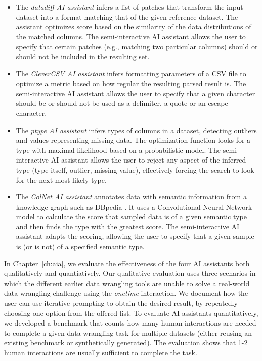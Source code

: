 \documentclass[fleqn,11pt]{report}
\theoremstyle{definition}
\newenvironment{nitemize}
{ \vspace{-0.4em}
  \begin{itemize}
    \setlength{\itemsep}{5pt}
    \setlength{\parskip}{0pt}
    \setlength{\parsep}{0pt} }
{ \end{itemize}
  \vspace{-0.4em} }
\begin{document}
\begin{nitemize}
\item The \emph{datadiff AI assistant} infers a list of patches that transform the input dataset
  into a format matching that of the given reference dataset. The assistant optimizes score based
  on the similarity of the data distributions of the matched columns. The semi-interactive AI
  assistant allows the user to specify that certain patches (e.g., matching two particular columns)
  should or should not be included in the resulting set.

\item The \emph{CleverCSV AI assistant} infers formatting parameters of a CSV file to optimize a
  metric based on how regular the resulting parsed result is. The semi-interactive AI assistant
  allows the user to specify that a given character should be or should not be used as a delimiter,
  a quote or an escape character.

\item The \emph{ptype AI assistant} infers types of columns in a dataset, detecting outliers and
  values representing missing data. The optimization function looks for a type with maximal
  likelihood based on a probabilistic model. The semi-interactive AI assistant allows the user
  to reject any aspect of the inferred type (type itself, outlier, missing value), effectively
  forcing the search to look for the next most likely type.

\item The \emph{ColNet AI assistant} annotates data with semantic information from a knowledge
  graph such as DBpedia \citep{lehmann-2015-dbpedia}. It uses a Convolutional Neural Network model
  to calculate the score that sampled data is of a given semantic type and then finds the type
  with the greatest score. The semi-interactive AI assistant adapts the scoring, allowing the
  user to specify that a given sample is (or is not) of a specified semantic type.
\end{nitemize}

In Chapter~\ref{ch:aia}, we evaluate the effectiveness of the four AI assistants both qualitatively
and quantiatively. Our qualitative evaluation uses three scenarios in which the different
earlier data wrangling tools are unable to solve a real-world data wrangling challenge using
the \emph{onetime} interaction. We document how the user can use iterative prompting to obtain
the desired result, by repeatedly choosing one option from the offered list. To evaluate
AI assistants quantitatively, we developed a benchmark that counts how many human interactions
are needed to complete a given data wrangling task for multiple datasets (either reusing an
existing benchmark or synthetically generated). The evaluation shows that 1-2 human interactions
are usually sufficient to complete the task.
\end{document}
